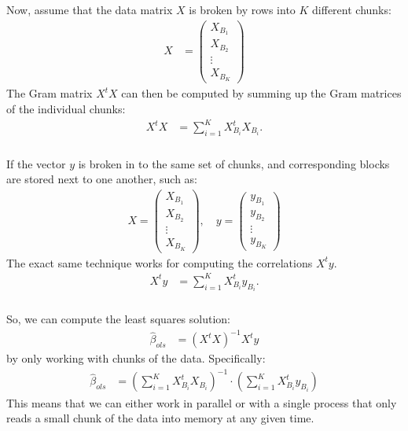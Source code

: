 \documentclass[xetex,mathserif,serif,aspectratio=169]{beamer}
\begin{document}
\begin{frame}[fragile] \frametitle{} \oldB \small

Now, assume that the data matrix $X$ is broken by rows into
$K$ different chunks:
\begin{align*}
X &= \left( \begin{array}{c} X_{B_1} \\ X_{B_2} \\ \vdots \\ X_{B_K} \end{array} \right)
\end{align*}
\pause The Gram matrix $X^tX$ can then be computed by summing up the
Gram matrices of the individual chunks:
\begin{align*}
X^t X &= \sum_{i=1}^K X_{B_i}^t X_{B_i}.
\end{align*}

\end{frame}

\begin{frame}[fragile] \frametitle{} \oldB \small

If the vector $y$ is broken in to the same set of chunks, and
corresponding blocks are stored next to one another, such as:
\begin{align*}
X = \left( \begin{array}{c} X_{B_1} \\ X_{B_2} \\ \vdots \\ X_{B_K} \end{array} \right),
\quad y = \left( \begin{array}{c} y_{B_1} \\ y_{B_2} \\ \vdots \\ y_{B_K} \end{array} \right)
\end{align*}
The exact same technique works for computing the correlations $X^t y$.
\begin{align*}
X^t y &= \sum_{i=1}^K X_{B_i}^t y_{B_i}.
\end{align*}

\end{frame}

\begin{frame}[fragile] \frametitle{} \oldB \small

So, we can compute the least squares solution:
\begin{align*}
\widehat{\beta}_{ols} &= (X^t X)^{-1} X^t y
\end{align*}
by only working with chunks of the data. Specifically:
\begin{align*}
\widehat{\beta}_{ols} &= \left(\sum_{i=1}^K X_{B_i}^t X_{B_i}\right)^{-1} \cdot \left(\sum_{i=1}^K X_{B_i}^t y_{B_i} \right)
\end{align*}
This means that
we can either work in parallel or with a single process that
only reads a small chunk of the data into memory at any given
time.

\end{frame}
\end{document}
